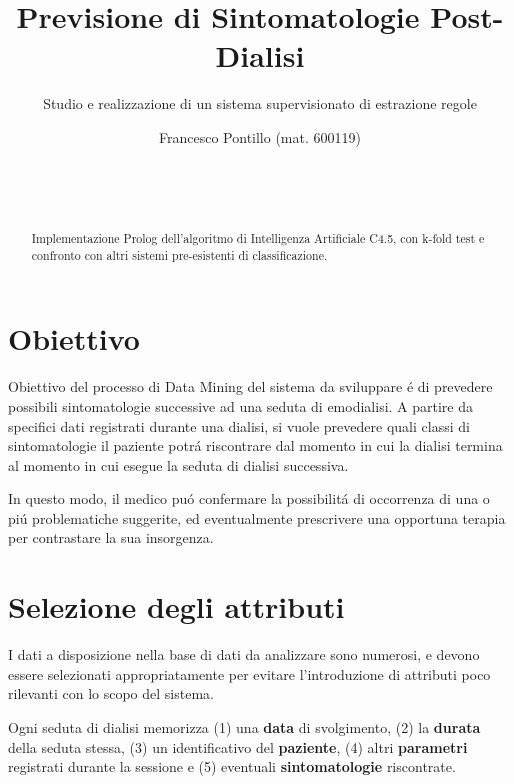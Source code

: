 \documentclass[preprint]{acm_proc_article-sp}
\begin{document}
\title{Previsione di Sintomatologie Post-Dialisi}
\subtitle{Studio e realizzazione di un sistema supervisionato di estrazione regole}

\author{
	\alignauthor
	Francesco Pontillo (mat. 600119)\\
       \\
       \\
       \\
}

\maketitle

\begin{abstract}
Implementazione Prolog dell'algoritmo di Intelligenza Artificiale C4.5, con k-fold test e confronto con altri sistemi pre-esistenti di classificazione.
\end{abstract}

\section{Obiettivo}
Obiettivo del processo di Data Mining del sistema da sviluppare \'e di prevedere possibili sintomatologie successive ad una seduta di emodialisi.
A partire da specifici dati registrati durante una dialisi, si vuole prevedere quali classi di sintomatologie il paziente potr\'a riscontrare dal momento in cui la dialisi termina al momento in cui esegue la seduta di dialisi successiva.

In questo modo, il medico pu\'o confermare la possibilit\'a di occorrenza di una o pi\'u problematiche suggerite, ed eventualmente prescrivere una opportuna terapia per contrastare la sua insorgenza.

\section{Selezione degli attributi}
I dati a disposizione nella base di dati da analizzare sono numerosi, e devono essere selezionati appropriatamente per evitare l'introduzione di attributi poco rilevanti con lo scopo del sistema.

Ogni seduta di dialisi memorizza (1) una \textbf{data} di svolgimento, (2) la \textbf{durata} della seduta stessa, (3) un identificativo del \textbf{paziente}, (4) altri \textbf{parametri} registrati durante la sessione e (5) eventuali \textbf{sintomatologie} riscontrate.
\end{document}
